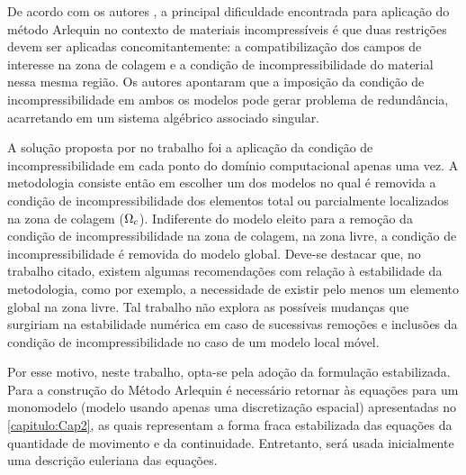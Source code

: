 De acordo com os autores , a principal dificuldade encontrada para aplicação do método Arlequin no contexto de materiais incompressíveis é que duas restrições devem ser aplicadas concomitantemente: a compatibilização dos campos de interesse na zona de colagem e a condição de incompressibilidade do material nessa mesma região. Os autores apontaram que a imposição da condição de incompressibilidade em ambos os modelos pode gerar problema de redundância, acarretando em um sistema algébrico associado singular.

A solução proposta por  no trabalho foi a aplicação da condição de incompressibilidade em cada ponto do domínio computacional apenas uma vez. A metodologia consiste então em escolher um dos modelos no qual é removida a condição de incompressibilidade dos elementos total ou parcialmente localizados na zona de colagem ($\Omega_c$). Indiferente do modelo eleito para a remoção da condição de incompressibilidade na zona de colagem, na zona livre, a condição de incompressibilidade é removida do modelo global. Deve-se destacar que, no trabalho citado, existem algumas recomendações com relação à estabilidade da metodologia, como por exemplo, a necessidade de existir pelo menos um elemento global na zona livre. Tal trabalho não explora as possíveis mudanças que surgiriam na estabilidade numérica em caso de sucessivas remoções e inclusões da condição de incompressibilidade no caso de um modelo local móvel.

Por esse motivo, neste trabalho, opta-se pela adoção da formulação estabilizada.
Para a construção do Método Arlequin é necessário retornar às equações para um monomodelo (modelo usando apenas uma discretização espacial) apresentadas no \autoref{capitulo:Cap2}, as quais representam a forma fraca estabilizada das equações da quantidade de movimento e da continuidade. Entretanto, será usada inicialmente uma descrição euleriana das equações.

